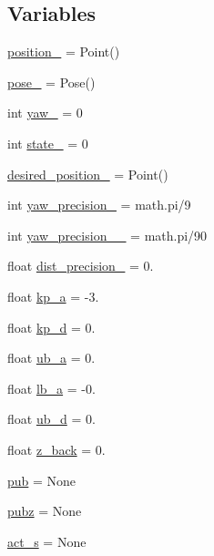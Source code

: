 \subsection*{Variables}
\begin{DoxyCompactItemize}
\item 
\hyperlink{namespacego__to__point__ball_aa399e57145dd0af7eefcd5fab4174fe9}{position\+\_\+} = Point()
\item 
\hyperlink{namespacego__to__point__ball_a03f1d8b257a2ae3d173a18c3fc2f8602}{pose\+\_\+} = Pose()
\item 
int \hyperlink{namespacego__to__point__ball_a74d8ca28c507d35baf1ea8e8f9595a78}{yaw\+\_\+} = 0
\item 
int \hyperlink{namespacego__to__point__ball_a0028df70b94b4041119cceba5e5aa79d}{state\+\_\+} = 0
\item 
\hyperlink{namespacego__to__point__ball_ac81a8393fb253c9e0b7255f779f16884}{desired\+\_\+position\+\_\+} = Point()
\item 
int \hyperlink{namespacego__to__point__ball_acc228d72c1ee47a43061e3563ac20d5c}{yaw\+\_\+precision\+\_\+} = math.\+pi/9
\item 
int \hyperlink{namespacego__to__point__ball_a1985c69cf8534ba0bd2c6080f788a992}{yaw\+\_\+precision\+\_\+\_\+} = math.\+pi/90
\item 
float \hyperlink{namespacego__to__point__ball_a9a02c8ca89a09909111972ec4fd317ca}{dist\+\_\+precision\+\_\+} = 0.
\item 
float \hyperlink{namespacego__to__point__ball_aac67ecb6c41141092b1ccaba4b537afc}{kp\+\_\+a} = -\/3.
\item 
float \hyperlink{namespacego__to__point__ball_aeb49969b88b7ca77d9abdeae42cb1964}{kp\+\_\+d} = 0.
\item 
float \hyperlink{namespacego__to__point__ball_aa5173a26f3502ea035d7c563bbf1fb05}{ub\+\_\+a} = 0.
\item 
float \hyperlink{namespacego__to__point__ball_ae6440cb2a8ea6e8e7d2327cb4cd12dd3}{lb\+\_\+a} = -\/0.
\item 
float \hyperlink{namespacego__to__point__ball_a1dabe6f24f898fa6f5303959917de757}{ub\+\_\+d} = 0.
\item 
float \hyperlink{namespacego__to__point__ball_a176944c73499ce72fa754c7e1a6d138d}{z\+\_\+back} = 0.
\item 
\hyperlink{namespacego__to__point__ball_a00b95c7141b558cd4466ca89d7c81640}{pub} = None
\item 
\hyperlink{namespacego__to__point__ball_ae3016b9645d9bd2b863a34a30115a6af}{pubz} = None
\item 
\hyperlink{namespacego__to__point__ball_a9ac8c67ea55b320e5eb2bdf665173ffa}{act\+\_\+s} = None
\end{DoxyCompactItemize}


